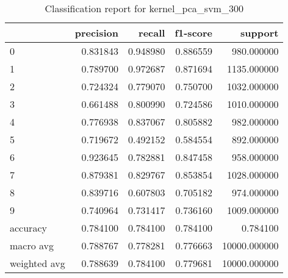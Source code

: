 \begin{table}[htb!]
\centering
\caption{Classification report for kernel_pca_svm_300}
\label{tab:classification-report-kernel_pca_svm_300}
\begin{tabular}{lrrrr}
\toprule
 & precision & recall & f1-score & support \\
\midrule
0 & 0.831843 & 0.948980 & 0.886559 & 980.000000 \\
1 & 0.789700 & 0.972687 & 0.871694 & 1135.000000 \\
2 & 0.724324 & 0.779070 & 0.750700 & 1032.000000 \\
3 & 0.661488 & 0.800990 & 0.724586 & 1010.000000 \\
4 & 0.776938 & 0.837067 & 0.805882 & 982.000000 \\
5 & 0.719672 & 0.492152 & 0.584554 & 892.000000 \\
6 & 0.923645 & 0.782881 & 0.847458 & 958.000000 \\
7 & 0.879381 & 0.829767 & 0.853854 & 1028.000000 \\
8 & 0.839716 & 0.607803 & 0.705182 & 974.000000 \\
9 & 0.740964 & 0.731417 & 0.736160 & 1009.000000 \\
accuracy & 0.784100 & 0.784100 & 0.784100 & 0.784100 \\
macro avg & 0.788767 & 0.778281 & 0.776663 & 10000.000000 \\
weighted avg & 0.788639 & 0.784100 & 0.779681 & 10000.000000 \\
\bottomrule
\end{tabular}
\end{table}
